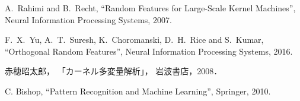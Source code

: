 %


\begin{thebibliography}{9}

    A.~Rahimi and B.~Recht, 
    ``Random Features for Large-Scale Kernel Machines'',
    Neural Information Processing Systems, 2007.

    F.~X.~Yu, A.~T.~Suresh, K.~Choromanski, D.~H.~Rice and S.~Kumar,
    ``Orthogonal Random Features'',
    Neural Information Processing Systems, 2016.

    赤穂昭太郎，
    「カーネル多変量解析」，
    岩波書店，2008．

    C. Bishop,
    ``Pattern Recognition and Machine Learning'',
    Springer, 2010.

\end{thebibliography}


